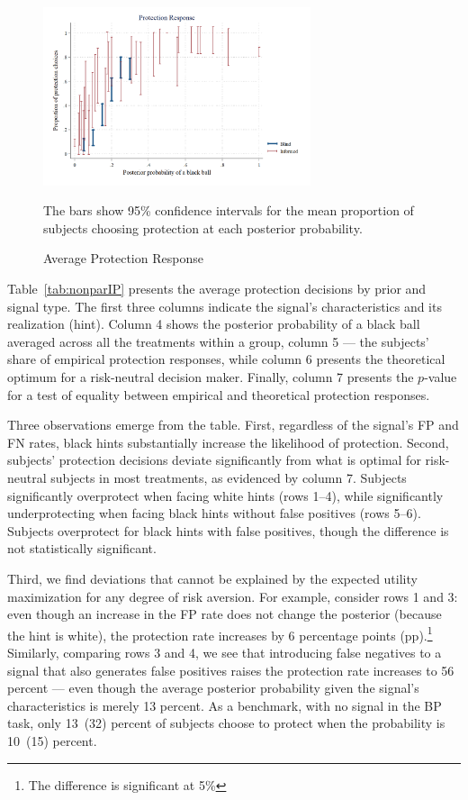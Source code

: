 \documentclass[12pt,a4paper]{article}
\newcommand{\fnote}[1]{\captionsetup{font={small, it}, aboveskip=0pt} \caption*{#1}}
\begin{document}
\begin{figure}[H]
\centering
\caption{Average Protection Response} \label{fig:ProtResponse}
  \includegraphics[width=0.7\textwidth]{Graphs/ip_response_comp.png}
\fnote{The bars show 95\% confidence intervals for the mean proportion of subjects choosing protection at each posterior probability.}
\end{figure}

Table~\ref{tab:nonparIP} presents the average protection decisions by prior and signal type. The first three columns indicate the signal's characteristics and its realization (hint). Column 4 shows the posterior probability of a black ball averaged across all the treatments within a group, column 5 --- the subjects' share of empirical protection responses, while column 6 presents the theoretical optimum for a risk-neutral decision maker. Finally, column 7 presents the $p$-value for a test of equality between empirical and theoretical protection responses.

Three observations emerge from the table. First, regardless of the signal's FP and FN rates, black hints substantially increase the likelihood of protection.  Second, subjects' protection decisions deviate significantly from what is optimal for risk-neutral subjects in most treatments, as evidenced by column 7. Subjects significantly overprotect when facing white hints (rows 1--4), while significantly underprotecting when facing black hints without false positives (rows 5--6).  Subjects overprotect for black hints with false positives, though the difference is not statistically significant. 

Third, we find deviations that cannot be explained by the expected utility maximization for any degree of risk aversion. For example, consider rows 1 and 3: even though an increase in the FP rate does not change the posterior (because the hint is white), the protection rate increases by 6 percentage points (pp).\footnote{The difference is significant at 5\%} Similarly, comparing rows 3 and 4, we see that introducing false negatives to a signal that also generates false positives raises the protection rate increases to 56 percent --- even though the average posterior probability given the signal's characteristics is merely 13 percent. As a benchmark, with no signal in the BP task, only 13~(32) percent of subjects choose to protect when the probability is 10~(15) percent. 
\end{document}
